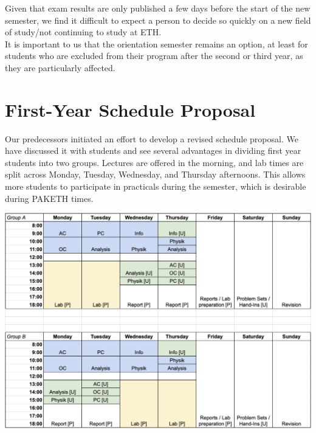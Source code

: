 \documentclass{article}
\begin{document}
Given that exam results are only published a few days before the start of the new semester, we find it difficult to expect a person to decide so quickly on a new field of study/not continuing to study at ETH.\\

It is important to us that the orientation semester remains an option, at least for students who are excluded from their program after the second or third year, as they are particularly affected.

\newpage
\section{First-Year Schedule Proposal}
Our predecessors initiated an effort to develop a revised schedule proposal. We have discussed it with students and see several advantages in dividing first year students into two groups. Lectures are offered in the morning, and lab times are split across Monday, Tuesday, Wednesday, and Thursday afternoons. This allows more students to participate in practicals during the semester, which is desirable during PAKETH times.

\begin{center}
\includegraphics[width=0.9\linewidth]{Graphics/Screenshot 2024-11-08 at 07.54.10.png}
\end{center}
\end{document}
